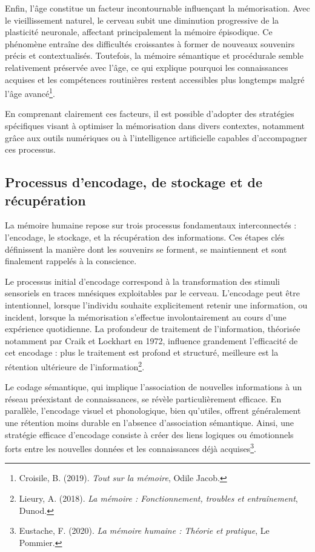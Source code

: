 \documentclass[12pt,a4paper]{report}
\begin{document}
Enfin, l’âge constitue un facteur incontournable influençant la mémorisation. Avec le vieillissement naturel, le cerveau subit une diminution progressive de la plasticité neuronale, affectant principalement la mémoire épisodique. Ce phénomène entraîne des difficultés croissantes à former de nouveaux souvenirs précis et contextualisés. Toutefois, la mémoire sémantique et procédurale semble relativement préservée avec l’âge, ce qui explique pourquoi les connaissances acquises et les compétences routinières restent accessibles plus longtemps malgré l’âge avancé\footnote{Croisile, B. (2019). \textit{Tout sur la mémoire}, Odile Jacob.}.

En comprenant clairement ces facteurs, il est possible d’adopter des stratégies spécifiques visant à optimiser la mémorisation dans divers contextes, notamment grâce aux outils numériques ou à l’intelligence artificielle capables d’accompagner ces processus.

\newpage
\subsection{Processus d’encodage, de stockage et de récupération}
La mémoire humaine repose sur trois processus fondamentaux interconnectés : l'encodage, le stockage, et la récupération des informations. Ces étapes clés définissent la manière dont les souvenirs se forment, se maintiennent et sont finalement rappelés à la conscience.

Le processus initial d'encodage correspond à la transformation des stimuli sensoriels en traces mnésiques exploitables par le cerveau. L'encodage peut être intentionnel, lorsque l'individu souhaite explicitement retenir une information, ou incident, lorsque la mémorisation s'effectue involontairement au cours d'une expérience quotidienne. La profondeur de traitement de l'information, théorisée notamment par Craik et Lockhart en 1972, influence grandement l’efficacité de cet encodage : plus le traitement est profond et structuré, meilleure est la rétention ultérieure de l'information\footnote{Lieury, A. (2018). \textit{La mémoire : Fonctionnement, troubles et entraînement}, Dunod.}.

Le codage sémantique, qui implique l'association de nouvelles informations à un réseau préexistant de connaissances, se révèle particulièrement efficace. En parallèle, l'encodage visuel et phonologique, bien qu'utiles, offrent généralement une rétention moins durable en l'absence d'association sémantique. Ainsi, une stratégie efficace d'encodage consiste à créer des liens logiques ou émotionnels forts entre les nouvelles données et les connaissances déjà acquises\footnote{Eustache, F. (2020). \textit{La mémoire humaine : Théorie et pratique}, Le Pommier.}.
\end{document}
